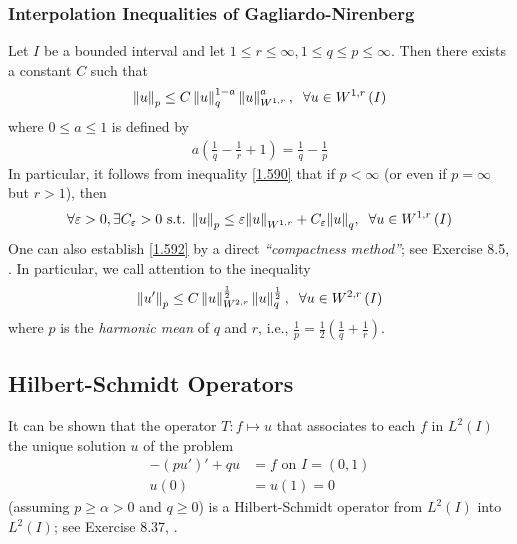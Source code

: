 \documentclass[a4paper,oneside]{book}
\numberwithin{equation}{chapter}
\begin{document}
\subsubsection{Interpolation Inequalities of Gagliardo-Nirenberg}
Let $I$ be a bounded interval and let $1\le r\le \infty,1\le q\le p\le \infty$. Then there exists a constant $C$ such that
\begin{align}
\label{1.590}
{\left\| u \right\|_p} \le C\left\| u \right\|_q^{1 - a}\left\| u \right\|_{{W^{1,r}}}^a,\hspace{0.2cm} \forall u \in {W^{1,r}}\left( I \right)
\end{align}
where $0\le a\le 1$ is defined by 
\begin{align}
a\left( {\frac{1}{q} - \frac{1}{r} + 1} \right) = \frac{1}{q} - \frac{1}{p}
\end{align}
In particular, it follows from inequality \eqref{1.590} that if $p<\infty$ (or even if $p=\infty$ but $r>1$), then
\begin{align}
\label{1.592}
\forall \varepsilon  > 0,\exists {C_\varepsilon } > 0\mbox{ s.t. } {\left\| u \right\|_p} \le \varepsilon {\left\| u \right\|_{{W^{1,r}}}} + {C_\varepsilon }{\left\| u \right\|_q},\hspace{0.2cm}\forall u \in {W^{1,r}}\left( I \right)
\end{align}
One can also establish \eqref{1.592} by a direct \textit{``compactness method''}; see Exercise 8.5, \cite{1}. In particular, we call attention to the inequality
\begin{align}
{\left\| {u'} \right\|_p} \le C\left\| u \right\|_{{W^{2,r}}}^{\frac{1}{2}}\left\| u \right\|_q^{\frac{1}{2}},\hspace{0.2cm}\forall u \in {W^{2,r}}\left( I \right)
\end{align}
where $p$ is the \textit{harmonic mean} of $q$ and $r$, i.e., $\frac{1}{p} = \frac{1}{2}\left( {\frac{1}{q} + \frac{1}{r}} \right)$.
\subsection{Hilbert-Schmidt Operators}
It can be shown that the operator $T:f\mapsto u$ that associates to each $f$ in $L^2\left(I\right)$ the unique solution $u$ of the problem
\begin{align}
 - \left( {pu'} \right)' + qu &= f\mbox{ on } I = \left( {0,1} \right)\\
u\left( 0 \right) &= u\left( 1 \right) = 0
\end{align}
(assuming $p\ge \alpha >0$ and $q\ge 0$) is a Hilbert-Schmidt operator from $L^2\left(I\right)$ into $L^2\left(I\right)$; see Exercise 8.37, \cite{1}.
\end{document}
